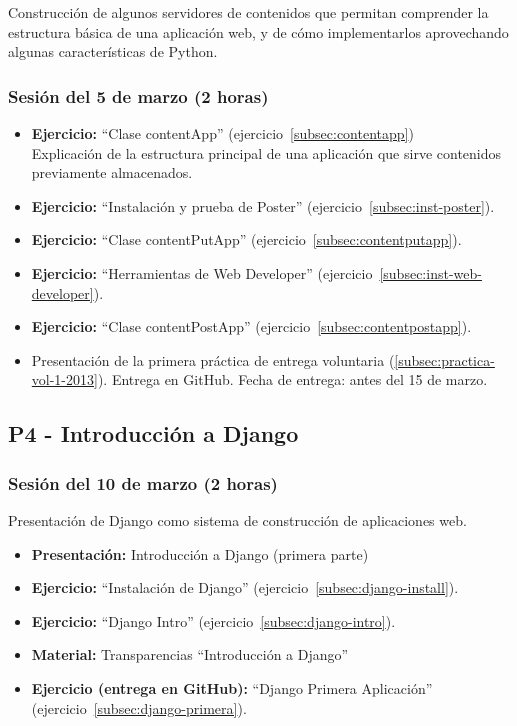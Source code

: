 \documentclass[a4paper,12pt]{article}
\begin{document}
Construcción de algunos servidores de contenidos que permitan comprender la estructura básica de una aplicación web, y de cómo implementarlos aprovechando algunas características de Python.

\subsubsection{Sesión del 5 de marzo (2 horas)}

\begin{itemize}
 \item \textbf{Ejercicio:}  ``Clase contentApp'' (ejercicio~\ref{subsec:contentapp}) \\
   Explicación de la estructura principal de una aplicación que sirve contenidos previamente almacenados.
 \item \textbf{Ejercicio:} ``Instalación y prueba de Poster'' (ejercicio~\ref{subsec:inst-poster}).
 \item \textbf{Ejercicio:} ``Clase contentPutApp'' (ejercicio~\ref{subsec:contentputapp}).
  \item \textbf{Ejercicio:} ``Herramientas de Web Developer'' (ejercicio~\ref{subsec:inst-web-developer}).
 \item \textbf{Ejercicio:} ``Clase contentPostApp'' (ejercicio~\ref{subsec:contentpostapp}).
  \item Presentación de la primera práctica de entrega voluntaria (\ref{subsec:practica-vol-1-2013}). Entrega en GitHub. Fecha de entrega: antes del 15 de marzo.
\end{itemize}


\subsection{P4 - Introducción a Django}

\subsubsection{Sesión del 10 de marzo (2 horas)}

Presentación de Django como sistema de construcción de aplicaciones web.

\begin{itemize}
 \item \textbf{Presentación:} Introducción a Django (primera parte)
 \item \textbf{Ejercicio:} ``Instalación de Django'' (ejercicio~\ref{subsec:django-install}).
 \item \textbf{Ejercicio:} ``Django Intro'' (ejercicio~\ref{subsec:django-intro}).
 \item \textbf{Material:} Transparencias ``Introducción a Django''
 \item \textbf{Ejercicio (entrega en GitHub):} ``Django Primera Aplicación'' (ejercicio~\ref{subsec:django-primera}).
\end{itemize}
\end{document}
